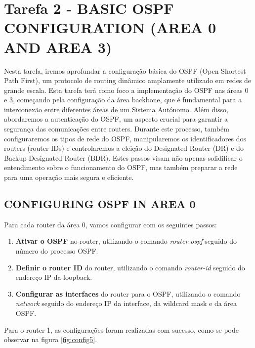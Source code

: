 \documentclass[11pt,english, openright, oneside]{book}
\begin{document}
\section{Tarefa 2 - BASIC OSPF CONFIGURATION (AREA 0 AND AREA 3)}
\vspace{0.2cm}
Nesta tarefa, iremos aprofundar a configuração básica do OSPF (Open Shortest Path First), um protocolo de routing dinâmico amplamente utilizado em redes de grande escala. Esta tarefa terá como foco a implementação do OSPF nas áreas 0 e 3, começando pela configuração da área backbone, que é fundamental para a interconexão entre diferentes áreas de um Sistema Autónomo. Além disso, abordaremos a autenticação do OSPF, um aspecto crucial para garantir a segurança das comunicações entre routers. Durante este processo, também configuraremos os tipos de rede do OSPF, manipularemos os identificadores dos routers (router IDs) e controlaremos a eleição do Designated Router (DR) e do Backup Designated Router (BDR). Estes passos visam não apenas solidificar o entendimento sobre o funcionamento do OSPF, mas também preparar a rede para uma operação mais segura e eficiente.
\vspace{0.2cm}

\subsection{CONFIGURING OSPF IN AREA 0}
\vspace{0.2cm}

Para cada router da área 0, vamos configurar com os seguintes passos:
\begin{enumerate}
  \item \textbf{Ativar o OSPF} no router, utilizando o comando \textit{router ospf} seguido do número do processo OSPF.
  \item \textbf{Definir o router ID} do router, utilizando o comando \textit{router-id} seguido do endereço IP da loopback.
  \item \textbf{Configurar as interfaces} do router para o OSPF, utilizando o comando \textit{network} seguido do endereço IP da interface, da wildcard mask e da área OSPF.
\end{enumerate}
\vspace{0.2cm}

Para o router 1, as configurações foram realizadas com sucesso, como se pode observar na figura \ref{fig:config5}.
\vspace{0.2cm}
\end{document}
